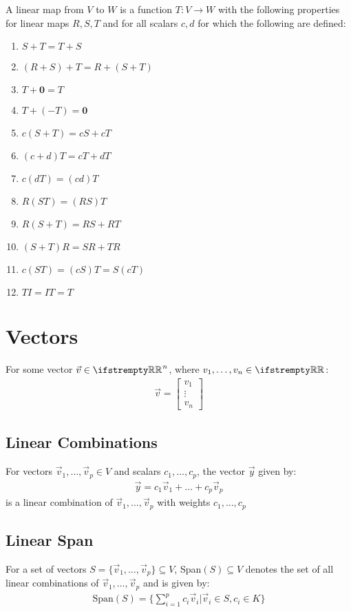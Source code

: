 \documentclass[12pt, a4paper]{article}
\begin{document}
\begin{multicols*}{3}
A linear map from $V$ to $W$ is a function $T: V \rightarrow W$ with the following properties for linear maps $R, S, T$ and for all scalars $c, d$ for which the following are defined:
\begin{enumerate}[\roman*.]
  \item $S + T = T + S$
  \item $(R + S) + T = R + (S + T)$
  \item $T + \mathbf{0} = T$
  \item $T + (-T) = \mathbf{0}$
  \item $c(S + T) = cS + cT$
  \item $(c+d)T = cT + dT$
  \item $c(dT) = (cd)T$
  \item $R(ST) = (RS)T$
  \item $R(S + T) = RS + RT$
  \item $(S+T)R = SR + TR$
  \item $c(ST) = (cS)T = S(cT)$
  \item $TI = IT = T$
\end{enumerate}

\colbreak

\section{Vectors}
For some vector $\vec{v} \in \RR^n$, where $v_1, \ldots, v_n \in \RR$:
\begin{align*}
  \vec{v} = \begin{bmatrix}
    v_1 \\
    \vdots \\
    v_n
  \end{bmatrix}
\end{align*}

\subsection{Linear Combinations}
For vectors $\vec{v}_1,\ldots,\vec{v}_p \in V$ and scalars $c_1,\ldots,c_p$, the vector $\vec{y}$ given by:
\begin{align*}
  \vec{y} = c_1\vec{v}_1 + \ldots + c_p\vec{v}_p
\end{align*}
is a linear combination of $\vec{v}_1,\ldots,\vec{v}_p$ with weights $c_1,\ldots,c_p$

\subsection{Linear Span}
For a set of vectors $S = \{\vec{v}_1,\ldots,\vec{v}_p\} \subseteq V$, Span$(S) \subseteq V$ denotes the set of all linear combinations of $\vec{v}_1,\ldots,\vec{v}_p$ and is given by:
\begin{align*}   
  \text{Span}(S) = \{ \sum^p_{i=1}c_i\vec{v}_i | \vec{v}_i \in S, c_i \in K\}
\end{align*}


\end{multicols*}
\end{document}
